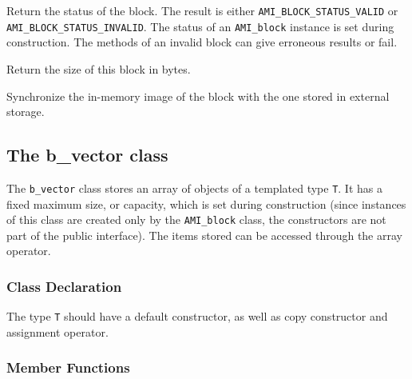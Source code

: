 	 {Return the status of the
	block. The result is either {\tt AMI\_BLOCK\_STATUS\_VALID} or {\tt
	AMI\_BLOCK\_STATUS\_INVALID}. The status of an {\tt AMI\_block}
	instance is set during construction. The methods of an invalid
	block can give erroneous results or fail.}

	 {Return the size of this block
	in bytes.}

	 {Synchronize the in-memory image of the
	block with the one stored in external storage.}

   \etabb

\subsection{The  b\_vector class}

The {\tt b\_vector} class stores an array of objects of a templated type
{\tt T}. It has a fixed maximum size, or capacity, which is set during
construction (since instances of this class are created only by the
{\tt AMI\_block} class, the constructors are not part of the public
interface). The items stored can be accessed through the array operator.

\subsubsection{Class Declaration}
   \btabb 
	 {The type {\tt T}
	should have a default constructor, as well as copy constructor and
	assignment operator.}
   \etabb

%
%

\subsubsection{Member Functions}


